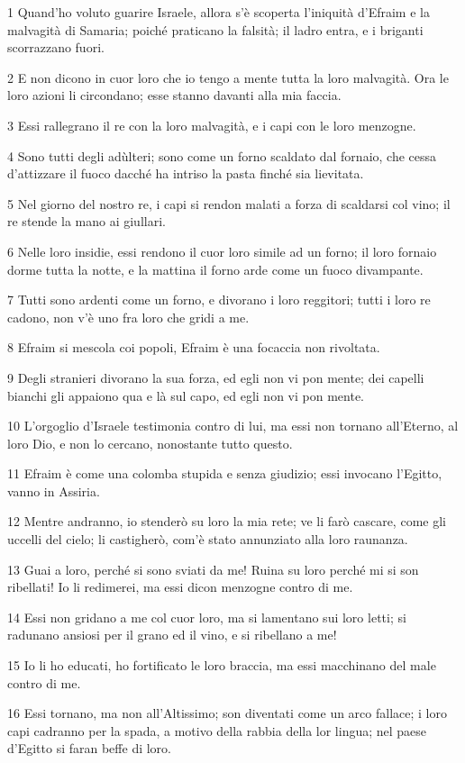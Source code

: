 \par 1 Quand'ho voluto guarire Israele, allora s'è scoperta l'iniquità d'Efraim e la malvagità di Samaria; poiché praticano la falsità; il ladro entra, e i briganti scorrazzano fuori.
\par 2 E non dicono in cuor loro che io tengo a mente tutta la loro malvagità. Ora le loro azioni li circondano; esse stanno davanti alla mia faccia.
\par 3 Essi rallegrano il re con la loro malvagità, e i capi con le loro menzogne.
\par 4 Sono tutti degli adùlteri; sono come un forno scaldato dal fornaio, che cessa d'attizzare il fuoco dacché ha intriso la pasta finché sia lievitata.
\par 5 Nel giorno del nostro re, i capi si rendon malati a forza di scaldarsi col vino; il re stende la mano ai giullari.
\par 6 Nelle loro insidie, essi rendono il cuor loro simile ad un forno; il loro fornaio dorme tutta la notte, e la mattina il forno arde come un fuoco divampante.
\par 7 Tutti sono ardenti come un forno, e divorano i loro reggitori; tutti i loro re cadono, non v'è uno fra loro che gridi a me.
\par 8 Efraim si mescola coi popoli, Efraim è una focaccia non rivoltata.
\par 9 Degli stranieri divorano la sua forza, ed egli non vi pon mente; dei capelli bianchi gli appaiono qua e là sul capo, ed egli non vi pon mente.
\par 10 L'orgoglio d'Israele testimonia contro di lui, ma essi non tornano all'Eterno, al loro Dio, e non lo cercano, nonostante tutto questo.
\par 11 Efraim è come una colomba stupida e senza giudizio; essi invocano l'Egitto, vanno in Assiria.
\par 12 Mentre andranno, io stenderò su loro la mia rete; ve li farò cascare, come gli uccelli del cielo; li castigherò, com'è stato annunziato alla loro raunanza.
\par 13 Guai a loro, perché si sono sviati da me! Ruina su loro perché mi si son ribellati! Io li redimerei, ma essi dicon menzogne contro di me.
\par 14 Essi non gridano a me col cuor loro, ma si lamentano sui loro letti; si radunano ansiosi per il grano ed il vino, e si ribellano a me!
\par 15 Io li ho educati, ho fortificato le loro braccia, ma essi macchinano del male contro di me.
\par 16 Essi tornano, ma non all'Altissimo; son diventati come un arco fallace; i loro capi cadranno per la spada, a motivo della rabbia della lor lingua; nel paese d'Egitto si faran beffe di loro.

